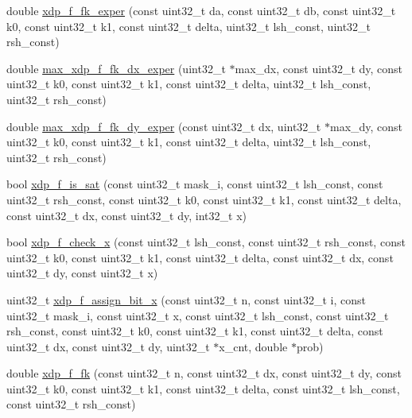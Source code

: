 \begin{DoxyCompactItemize}
\item 
double \hyperlink{xdp-tea-f-fk_8hh_af2db89390c1b79d21e9426301133677a}{xdp\-\_\-f\-\_\-fk\-\_\-exper} (const uint32\-\_\-t da, const uint32\-\_\-t db, const uint32\-\_\-t k0, const uint32\-\_\-t k1, const uint32\-\_\-t delta, uint32\-\_\-t lsh\-\_\-const, uint32\-\_\-t rsh\-\_\-const)
\item 
double \hyperlink{xdp-tea-f-fk_8hh_ae697ec9a1dcb67277eee7817501f9fa9}{max\-\_\-xdp\-\_\-f\-\_\-fk\-\_\-dx\-\_\-exper} (uint32\-\_\-t $\ast$max\-\_\-dx, const uint32\-\_\-t dy, const uint32\-\_\-t k0, const uint32\-\_\-t k1, const uint32\-\_\-t delta, uint32\-\_\-t lsh\-\_\-const, uint32\-\_\-t rsh\-\_\-const)
\item 
double \hyperlink{xdp-tea-f-fk_8hh_a3eba231310409bff7512be456f0329b4}{max\-\_\-xdp\-\_\-f\-\_\-fk\-\_\-dy\-\_\-exper} (const uint32\-\_\-t dx, uint32\-\_\-t $\ast$max\-\_\-dy, const uint32\-\_\-t k0, const uint32\-\_\-t k1, const uint32\-\_\-t delta, uint32\-\_\-t lsh\-\_\-const, uint32\-\_\-t rsh\-\_\-const)
\item 
bool \hyperlink{xdp-tea-f-fk_8hh_aba9a33f69d29af6f9ffea5590bc902d2}{xdp\-\_\-f\-\_\-is\-\_\-sat} (const uint32\-\_\-t mask\-\_\-i, const uint32\-\_\-t lsh\-\_\-const, const uint32\-\_\-t rsh\-\_\-const, const uint32\-\_\-t k0, const uint32\-\_\-t k1, const uint32\-\_\-t delta, const uint32\-\_\-t dx, const uint32\-\_\-t dy, int32\-\_\-t x)
\item 
bool \hyperlink{xdp-tea-f-fk_8hh_a3aa2bec1e1d27e27741f2f7e46f4ac28}{xdp\-\_\-f\-\_\-check\-\_\-x} (const uint32\-\_\-t lsh\-\_\-const, const uint32\-\_\-t rsh\-\_\-const, const uint32\-\_\-t k0, const uint32\-\_\-t k1, const uint32\-\_\-t delta, const uint32\-\_\-t dx, const uint32\-\_\-t dy, const uint32\-\_\-t x)
\item 
uint32\-\_\-t \hyperlink{xdp-tea-f-fk_8hh_acce345a641b8a7372b2b2a562fc1ba8c}{xdp\-\_\-f\-\_\-assign\-\_\-bit\-\_\-x} (const uint32\-\_\-t n, const uint32\-\_\-t i, const uint32\-\_\-t mask\-\_\-i, const uint32\-\_\-t x, const uint32\-\_\-t lsh\-\_\-const, const uint32\-\_\-t rsh\-\_\-const, const uint32\-\_\-t k0, const uint32\-\_\-t k1, const uint32\-\_\-t delta, const uint32\-\_\-t dx, const uint32\-\_\-t dy, uint32\-\_\-t $\ast$x\-\_\-cnt, double $\ast$prob)
\item 
double \hyperlink{xdp-tea-f-fk_8hh_aa4597c33ca147a102d557fc93c23b802}{xdp\-\_\-f\-\_\-fk} (const uint32\-\_\-t n, const uint32\-\_\-t dx, const uint32\-\_\-t dy, const uint32\-\_\-t k0, const uint32\-\_\-t k1, const uint32\-\_\-t delta, const uint32\-\_\-t lsh\-\_\-const, const uint32\-\_\-t rsh\-\_\-const)

\end{DoxyCompactItemize}
